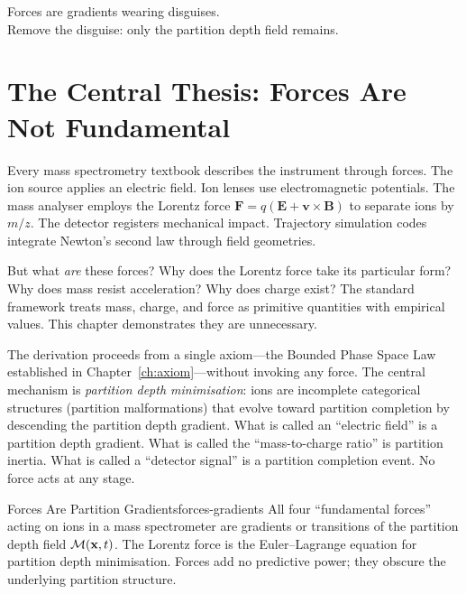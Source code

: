 
\epigraph{%
  Forces are gradients wearing disguises.\\
  Remove the disguise: only the partition depth field remains.%
}{}

\section{The Central Thesis: Forces Are Not Fundamental}
\label{sec:ch21-thesis}

Every mass spectrometry textbook describes the instrument through forces.  The
ion source applies an electric field.  Ion lenses use electromagnetic potentials.
The mass analyser employs the Lorentz force $\mathbf{F} = q(\mathbf{E}+\mathbf{v}
\times\mathbf{B})$ to separate ions by $m/z$.  The detector registers
mechanical impact.  Trajectory simulation codes integrate Newton's second law
through field geometries.

But what \emph{are} these forces?  Why does the Lorentz force take its
particular form?  Why does mass resist acceleration?  Why does charge exist?
The standard framework treats mass, charge, and force as primitive quantities
with empirical values.  This chapter demonstrates they are unnecessary.

The derivation proceeds from a single axiom---the Bounded Phase Space Law
established in Chapter~\ref{ch:axiom}---without invoking any force.  The
central mechanism is \emph{partition depth minimisation}: ions are incomplete
categorical structures (partition malformations) that evolve toward partition
completion by descending the partition depth gradient.  What is called an
``electric field'' is a partition depth gradient.  What is called the
``mass-to-charge ratio'' is partition inertia.  What is called a ``detector
signal'' is a partition completion event.  No force acts at any stage.

\begin{consequence}{Forces Are Partition Gradients}{forces-gradients}
  All four ``fundamental forces'' acting on ions in a mass spectrometer are
  gradients or transitions of the partition depth field $\mathcal{M}(\mathbf{x},t)$.
  The Lorentz force is the Euler--Lagrange equation for partition depth
  minimisation.  Forces add no predictive power; they obscure the underlying
  partition structure.
\end{consequence}

